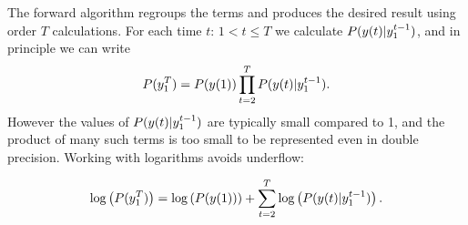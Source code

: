 The forward algorithm regroups the terms and produces the desired
result using order $T$ calculations.  For each time $t:\, 1 < t \leq
T$ we calculate $P({y}{(t)}|y_{1}^{t-1})$, and in principle we can
write
\begin{equation*}
  P(y_{1}^{T}) = P({y}{(1)}) \prod_{t=2}^T P({y}{(t)}|y_{1}^{t-1}).
\end{equation*}
However the values of $P({y}{(t)}|y_{1}^{t-1})$ are typically
small compared to 1, and the product of many such terms is too small
to be represented even in double precision.  Working with logarithms
avoids underflow:

\begin{equation}
  \mlabel{eq:logP}
  \log\left( P(\ts{y}{1}{T}) \right) = \log\left( P(\ti{y}{1})
 \right) + \sum_{t=2}^T \log\left( P(\ti{y}{t}|\ts{y}{1}{t-1})\right).
\end{equation}

\newcommand{\alphax}[2]{%
  \colorbox{yellow}{%
    $P_{S(#1)|\ts{Y}{1}{#1}}\left(#2 |\ts{y}{1}{#1} \right)$%
  }%
}%
\newcommand{\prealpha}{%
  \colorbox{green}{%
    $P_{\ti{S}{t}|\ts{Y}{1}{t-1}} \left(s | \ts{y}{1}{t-1} \right)$%
  }%
}%
\newcommand{\gammax}{%
  \colorbox{cyan}{%
    $P(\ti{y}{t}|\ts{y}{1}{t-1})$%
  }%
}%
\newcommand{\pregamma}{%
  \colorbox{pink}{%
    $P_{\ti{S}{t},\ti{Y}{t}|\ts{Y}{1}{t-1}} \left(s,\ti{y}{t}|\ts{y}{1}{t-1}\right)$%
  }%
}%

